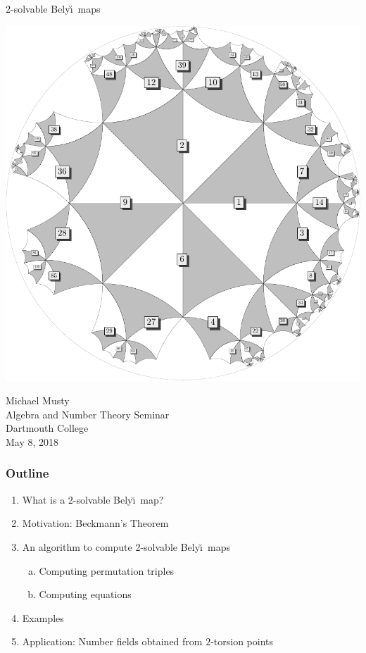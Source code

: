 \documentclass[xcolor=dvipsnames]{beamer}
\theoremstyle{plain}
\newcommand{\Belyi}{Bely\u{\i}}
\begin{document}
  \begin{frame}[plain]
    \begin{center}{
      \Huge\color{SeaGreen}
      $2$-solvable
      \Belyi\ maps
    }
    \end{center}
    \begin{center}
      \includegraphics[scale = 0.3]{128S36-g17.pdf}
    \end{center}
    \begin{center}
      Michael Musty\\
      Algebra and Number Theory Seminar\\
      Dartmouth College\\
      May 8, 2018
    \end{center}
  \end{frame}
  \begin{frame}[plain]
    \frametitle{Outline}
    \begin{enumerate}
      \item
        What is a 2-solvable \Belyi\ map?
      \item
        Motivation: Beckmann's Theorem
      \item
        An algorithm to compute 2-solvable \Belyi\ maps
        \begin{enumerate}[(a)]
          \item
            Computing permutation triples
          \item
            Computing equations
        \end{enumerate}
      \item
        Examples
      \item
        Application: Number fields obtained from $2$-torsion points
    \end{enumerate}
  \end{frame}
\end{document}
